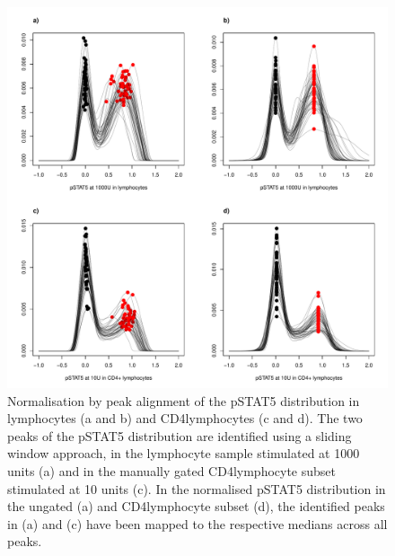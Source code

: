 \begin{figure}[h]
    \centering
    \includegraphics[scale=.5]{figures/pstat5-peak-normalisation.pdf}
    {Normalisation by peak alignment of the pSTAT5 distribution in lymphocytes (a and b) and CD4\positive lymphocytes (c and d).}
    {
      The two peaks of the pSTAT5 distribution are identified using a sliding window approach,
      in the lymphocyte sample stimulated at 1000 units (a) and in the manually gated CD4\positive lymphocyte subset stimulated at 10 units (c).
      In the normalised pSTAT5 distribution in the ungated (a) and CD4\positive lymphocyte subset (d),
      the identified peaks in (a) and (c) have been mapped to the respective medians across all peaks.
    }
\end{figure} 
\clearpage


